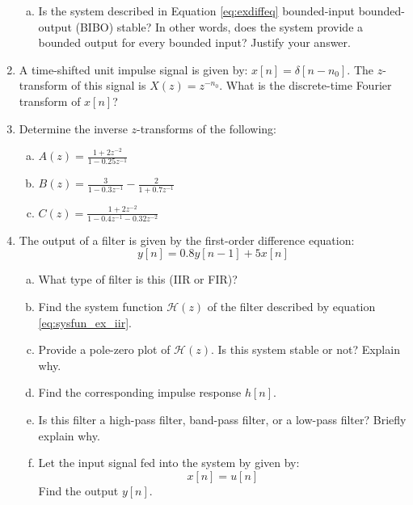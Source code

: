 \begin{enumerate}
\begin{enumerate}[a)]
\item Is the system described in Equation \ref{eq:exdiffeq} bounded-input bounded-output (BIBO) stable? In other words, does the system provide a bounded output for every bounded input? Justify your answer.

\end{enumerate}


\item A time-shifted unit impulse signal is given by: $x[n]=\delta[n-n_0]$. The $z$-transform of this signal is $X(z)=z^{-n_0}$. What is the discrete-time Fourier transform of $x[n]$?


\item Determine the inverse $z$-transforms of the following:
\begin{enumerate}[a)]
\item $A(z)=\frac{1+2z^{-2}}{1-0.25z^{-1}}$
\item $B(z)=\frac{3}{1-0.3z^{-1}} - \frac{2}{1+0.7z^{-1}}$
\item $C(z)=\frac{1+2z^{-2}}{1-0.4z^{-1}-0.32 z^{-2}}$
\end{enumerate}


\item The output of a filter is given by the first-order difference equation:
\begin{equation}
y[n]=0.8y[n-1]+5x[n]
\label{eq:sysfun_ex_iir}
\end{equation}
\begin{enumerate}[a)]
\item What type of filter is this (IIR or FIR)?
\item Find the system function $\mathcal{H}(z)$ of the filter described by equation \ref{eq:sysfun_ex_iir}.
\item Provide a pole-zero plot of $\mathcal{H}(z)$. Is this system stable or not? Explain why.
\item Find the corresponding impulse response $h[n]$.
\item Is this filter a high-pass filter, band-pass filter, or a low-pass filter? Briefly explain why.
\item Let the input signal fed into the system by given by:
\begin{equation}
x[n]=u[n]
\end{equation}
Find the output $y[n]$.
\end{enumerate}



\end{enumerate}
